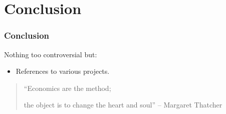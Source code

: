 \documentclass{beamer}
\begin{document}
\section{Conclusion}
\begin{frame}\frametitle{Conclusion}
Nothing too controversial but:
\begin{itemize}
\item References to various projects.
\end{itemize}
\pause
\begin{quote}
``Economics are the method; 

\pause
the object is to change the heart and soul'' -- Margaret Thatcher
\end{quote}
\end{frame}
\end{document}
